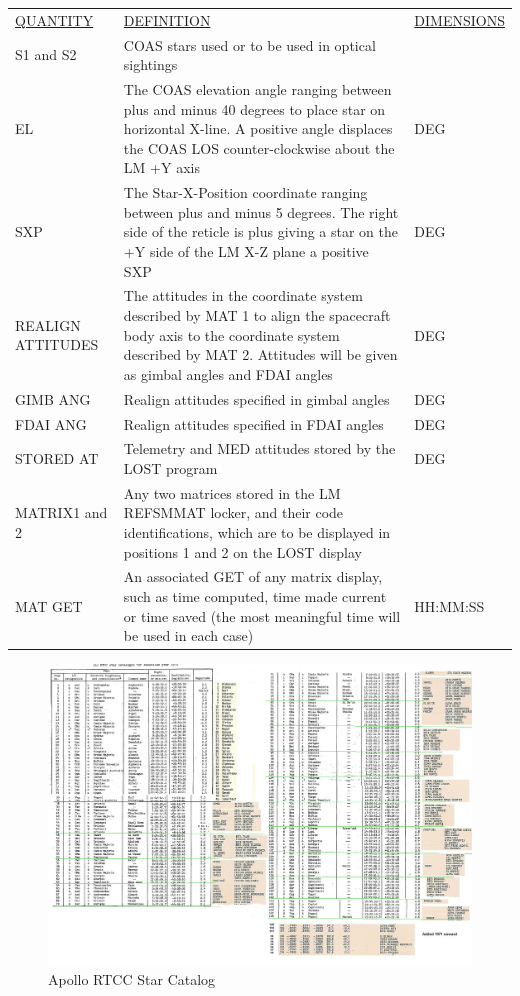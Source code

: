 \documentclass[11pt]{article} %
\begin{document}
\begin{center}
\begin{tabular}{ L{2.4cm} L{7.1cm} L{3cm} }
\underline{QUANTITY} & \underline{DEFINITION} & \underline{DIMENSIONS} \\
S1 and S2&COAS stars used or to be used in optical sightings&\\
EL&The COAS elevation angle ranging between plus and minus 40 degrees to place star on horizontal X-line. A positive angle displaces the COAS LOS counter-clockwise about the LM +Y axis&DEG\\
SXP&The Star-X-Position coordinate ranging between plus and minus 5 degrees. The right side of the reticle is plus giving a star on the +Y side of the LM X-Z plane a positive SXP&DEG\\
REALIGN ATTITUDES&The attitudes in the coordinate system described by MAT 1 to align the spacecraft body axis to the coordinate system described by MAT 2. Attitudes will be given as gimbal angles and FDAI angles&DEG\\
GIMB ANG&Realign attitudes specified in gimbal angles&DEG\\
FDAI ANG&Realign attitudes specified in FDAI angles&DEG\\
STORED AT&Telemetry and MED attitudes stored by the LOST program&DEG\\
MATRIX1 and 2&Any two matrices stored in the LM REFSMMAT locker, and their code identifications, which are to be displayed in positions 1 and 2 on the LOST display&\\
MAT GET&An associated GET of any matrix display, such as time computed, time made current or time saved (the most meaningful time will be used in each case)&HH:MM:SS\\
\end{tabular}
\end{center}

\newpage

\begin{landscape}
\begin{figure}[hbtp]
	\centering
		\includegraphics[width=1.3\textwidth]{./ApolloRTCCMFDFiles/Apollo RTCC STARS.jpg}
	\caption{Apollo RTCC Star Catalog}
	\label{fig:RTCCStars}
\end{figure}
\end{landscape}
\newpage
\end{document}
